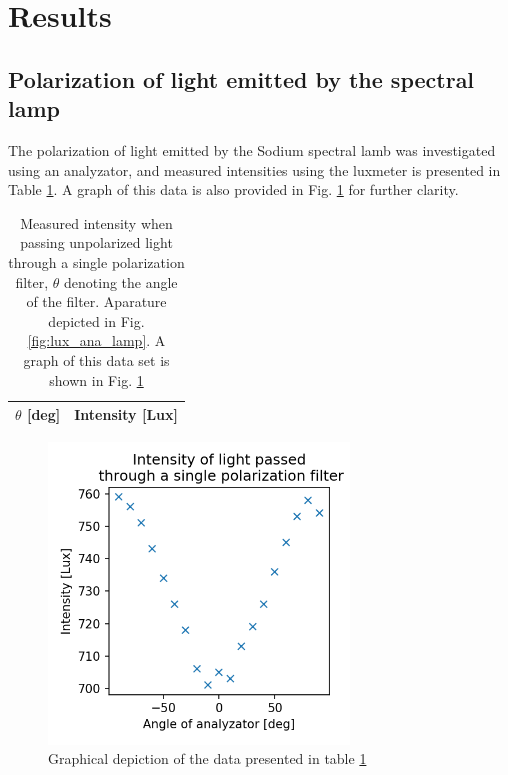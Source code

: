 \documentclass[11pt,a4paper]{article}
\begin{document}
\section{\label{sect:results}Results}
  
  \subsection{Polarization of light emitted by the spectral lamp}

  The polarization of light emitted by the Sodium spectral lamb was investigated using an analyzator, and measured intensities using the luxmeter is presented in Table \ref{tab:ana}. A graph of this data is also provided in Fig. \ref{fig:ana_plot} for further clarity.

  \begin{table}[H]
      \center
      \caption{Measured intensity when passing unpolarized light through a single polarization filter, $\theta$ denoting the angle of the filter. Aparature depicted in Fig. \ref{fig:lux_ana_lamp}. A graph of this data set is shown in Fig. \ref{fig:ana_plot}}
       \begin{tabular}{r | l}
        $\theta$ [deg] & Intensity [Lux] \\ \hline
         
       \end{tabular}
       \label{tab:ana}
  \end{table}

  \begin{figure}[H]
    \center
    \includegraphics[width=8cm]{scripts/polartest.png}
    \caption{Graphical depiction of the data presented in table \ref{tab:ana}}
    \label{fig:ana_plot}
  \end{figure}
\end{document}
